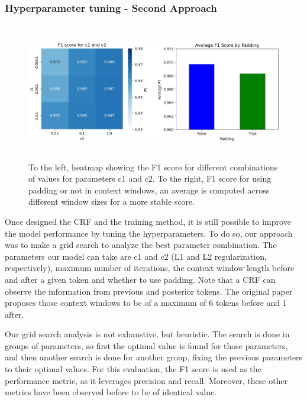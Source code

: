\documentclass{article}
\begin{document}
\subsubsection*{Hyperparameter tuning - Second Approach}
\begin{figure}[!t]
	\centering
	\includegraphics[height=6cm]{images/crf_heatmap_bars.jpg}
	\captionsetup{width=0.9\textwidth}
	\caption{To the left, heatmap showing the F1 score for different combinations of values for parameters
	c1 and c2. To the right, F1 score for using padding or not in context windows, an average is computed
	across different window sizes for a more stable score.}
	\label{fig:crf_heatmap_bars}
\end{figure}

Once designed the CRF and the training method, it is still possible to improve the model performance
by tuning the hyperparameters. To do so, our approach
was to make a grid search to analyze the best parameter combination. The parameters our model can take
are c1 and c2 (L1 and L2 regularization, respectively), maximum number of iterations, the context window
length before and after a given token and whether to use padding. Note that a CRF can observe the information
from previous and posterior tokens. The original paper proposes those context windows to be of a maximum of 6
tokens before and 1 after.

Our grid search analysis is not exhaustive, but heuristic. The search is done in groups of parameters, so
first the optimal value is found for those parameters, and then another search is done for another group,
fixing the previous parameters to their optimal values. For this evaluation, the F1 score is used as the
performance metric, as it leverages precision and recall. Moreover, these other metrics have been observed
before to be of identical value.
\end{document}
